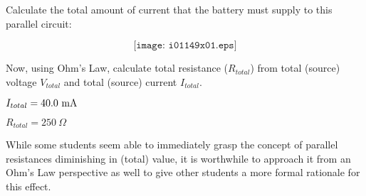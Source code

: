 

Calculate the total amount of current that the battery must supply to this parallel circuit:

$$\texttt{[image: i01149x01.eps]}$$

Now, using Ohm's Law, calculate total resistance ($R_{total}$) from total (source) voltage $V_{total}$ and total (source) current $I_{total}$.







$I_{total} = 40.0 \hbox{ mA}$

\vskip 10pt

$R_{total} = 250 \> \Omega$







While some students seem able to immediately grasp the concept of parallel resistances diminishing in (total) value, it is worthwhile to approach it from an Ohm's Law perspective as well to give other students a more formal rationale for this effect.




